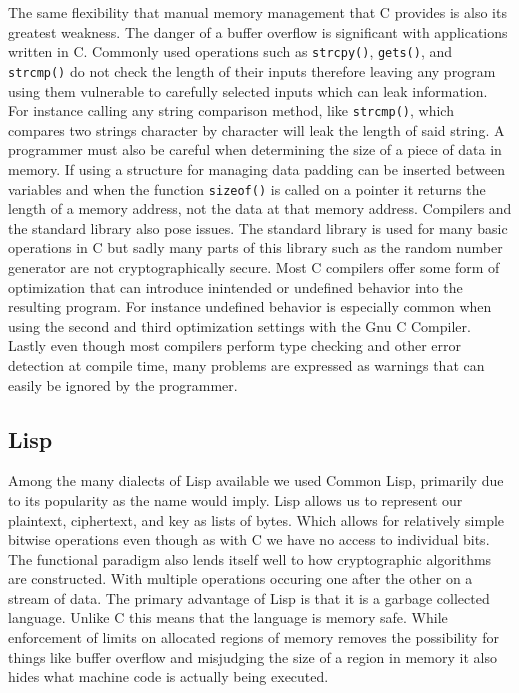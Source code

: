 The same flexibility that manual memory management that C provides is also its greatest weakness. The danger of a buffer overflow is significant with 
applications written in C. Commonly used operations such as \texttt{strcpy()}, \texttt{gets()}, and \texttt{strcmp()} do not check the length of 
their inputs therefore leaving any program using them vulnerable to carefully selected inputs which can leak information. For instance calling any 
string comparison method, like \texttt{strcmp()}, which compares two strings character by character will leak the length of said string. A programmer must also be 
careful when determining the size of a piece of data in memory. If using a structure for managing data padding can be inserted between variables and when the 
function \texttt{sizeof()} is called on a pointer it returns the length of a memory address, not the data at that memory address. Compilers and the standard 
library also pose issues. The standard library is used for many basic operations in C but sadly many parts of this library such as the random number generator 
are not cryptographically secure. Most C compilers offer some form of optimization that can introduce inintended or undefined behavior into the resulting 
program. For instance undefined behavior is especially common when using the second and third optimization settings with the Gnu C Compiler. Lastly even though most 
compilers perform type checking and other error detection at compile time, many problems are expressed as warnings that can easily be ignored by the programmer.

\subsection{Lisp}
Among the many dialects of Lisp available we used Common Lisp, primarily due to its popularity as the name would imply. Lisp allows us to represent our plaintext, 
ciphertext, and key as lists of bytes. Which allows for relatively simple bitwise operations even though as with C we have no access to individual bits. The functional
paradigm also lends itself well to how cryptographic algorithms are constructed. With multiple operations occuring one after the other on a stream of data. The primary 
advantage of Lisp is that it is a garbage collected language. Unlike C this means that the language is memory safe. While enforcement of limits on allocated 
regions of memory removes the possibility for things like buffer overflow and misjudging the size of a region in memory it also hides what machine code is actually 
being executed.

